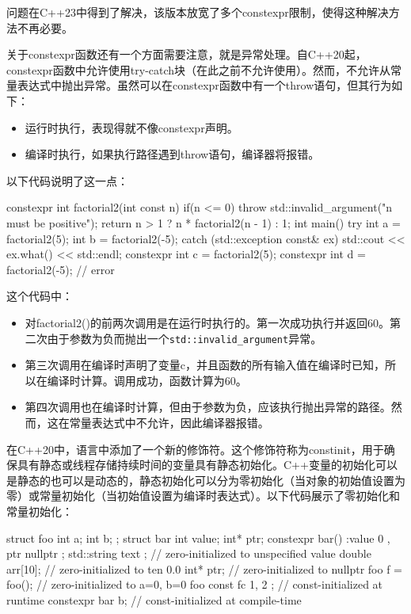 问题在C++23中得到了解决，该版本放宽了多个constexpr限制，使得这种解决方法不再必要。

关于constexpr函数还有一个方面需要注意，就是异常处理。自C++20起，constexpr函数中允许使用try-catch块（在此之前不允许使用）。然而，不允许从常量表达式中抛出异常。虽然可以在constexpr函数中有一个throw语句，但其行为如下：

\begin{itemize}
\item
运行时执行，表现得就不像constexpr声明。

\item
编译时执行，如果执行路径遇到throw语句，编译器将报错。
\end{itemize}

以下代码说明了这一点：

\begin{cpp}
constexpr int factorial2(int const n)
{
    if(n <= 0) throw std::invalid_argument("n must be positive");
    return n > 1 ? n * factorial2(n - 1) : 1;
}
int main()
{
    try
    {
        int a = factorial2(5);
        int b = factorial2(-5);
    }
    catch (std::exception const& ex)
    {
        std::cout << ex.what() << std::endl;
    }
    constexpr int c = factorial2(5);
    constexpr int d = factorial2(-5); // error
}
\end{cpp}

这个代码中：

\begin{itemize}
\item
对factorial2()的前两次调用是在运行时执行的。第一次成功执行并返回60。第二次由于参数为负而抛出一个\verb|std::invalid_argument|异常。

\item
第三次调用在编译时声明了变量c，并且函数的所有输入值在编译时已知，所以在编译时计算。调用成功，函数计算为60。

\item
第四次调用也在编译时计算，但由于参数为负，应该执行抛出异常的路径。然而，这在常量表达式中不允许，因此编译器报错。
\end{itemize}


在C++20中，语言中添加了一个新的修饰符。这个修饰符称为constinit，用于确保具有静态或线程存储持续时间的变量具有静态初始化。C++变量的初始化可以是静态的也可以是动态的，静态初始化可以分为零初始化（当对象的初始值设置为零）或常量初始化（当初始值设置为编译时表达式）。以下代码展示了零初始化和常量初始化：

\begin{cpp}
struct foo
{
    int a;
    int b;
};
struct bar
{
    int   value;
    int*  ptr;
    constexpr bar() :value{ 0 }, ptr{ nullptr } {}
};
std::string text {};  // zero-initialized to unspecified value
double arr[10];       // zero-initialized to ten 0.0
int* ptr;             // zero-initialized to nullptr
foo f = foo();        // zero-initialized to a=0, b=0
foo const fc{ 1, 2 }; // const-initialized at runtime
constexpr bar b;      // const-initialized at compile-time
\end{cpp}

